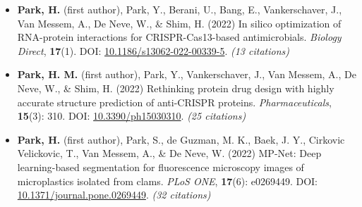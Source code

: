 \documentclass[11pt]{article}
\begin{document}
\begin{itemize}
    \item[\checkmark] \textbf{Park, H.} (first author), Park, Y., Berani, U., Bang, E., Vankerschaver, J., Van Messem, A., De Neve, W., \& Shim, H. (2022) In silico optimization of RNA-protein interactions for CRISPR-Cas13-based antimicrobials. \textit{Biology Direct}, \textbf{17}(1). DOI: \href{https://doi.org/10.1186/s13062-022-00339-5}{10.1186/s13062-022-00339-5}. \textit{(13 citations)}
    \item[\checkmark] \textbf{Park, H. M.} (first author), Park, Y., Vankerschaver, J., Van Messem, A., De Neve, W., \& Shim, H. (2022) Rethinking protein drug design with highly accurate structure prediction of anti-CRISPR proteins. \textit{Pharmaceuticals}, \textbf{15}(3): 310. DOI: \href{https://doi.org/10.3390/ph15030310}{10.3390/ph15030310}. \textit{(25 citations)}
    \item[\checkmark] \textbf{Park, H.} (first author), Park, S., de Guzman, M. K., Baek, J. Y., Cirkovic Velickovic, T., Van Messem, A., \& De Neve, W. (2022) MP-Net: Deep learning-based segmentation for fluorescence microscopy images of microplastics isolated from clams. \textit{PLoS ONE}, \textbf{17}(6): e0269449. DOI: \href{https://doi.org/10.1371/journal.pone.0269449}{10.1371/journal.pone.0269449}. \textit{(32 citations)}
\end{itemize}
\end{document}
